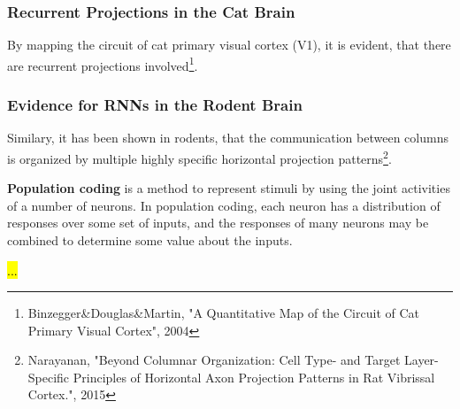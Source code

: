 \documentclass[main]{subfiles}
\begin{document}
\subsubsection{Recurrent Projections in the Cat Brain}
By mapping the circuit of cat primary visual cortex (V1), it is evident, that there are recurrent projections involved\footnote{Binzegger\&Douglas\&Martin, "A Quantitative Map of the Circuit of Cat Primary Visual Cortex", 2004}. 
\subsubsection{Evidence for RNNs in the Rodent Brain}
Similary, it has been shown in rodents, that the communication between columns is organized by multiple highly specific horizontal projection patterns\footnote{Narayanan, "Beyond Columnar Organization: Cell Type- and Target Layer-Specific Principles of Horizontal Axon Projection Patterns in Rat Vibrissal Cortex.", 2015}.

\textbf{Population coding} is a method to represent stimuli by using the joint activities of a number of neurons. In population coding, each neuron has a distribution of responses over some set of inputs, and the responses of many neurons may be combined to determine some value about the inputs.

\hl{...}
\end{document}
